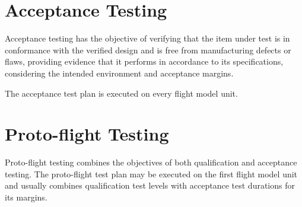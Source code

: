 \section{Acceptance Testing}

Acceptance testing has the objective of verifying that the item under test is in conformance with the verified design and is free from manufacturing defects or flaws, providing evidence that it performs in accordance to its specifications, considering the intended environment and acceptance margins.

The acceptance test plan is executed on every flight model unit.


\section{Proto-flight Testing}

Proto-flight testing combines the objectives of both qualification and acceptance testing. The proto-flight test plan may be executed on the first flight model unit and usually combines qualification test levels with acceptance test durations for its margins.